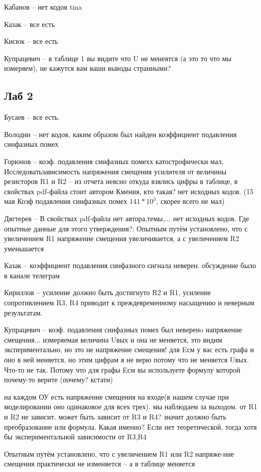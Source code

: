 \documentclass[a4paper,11pt]{article}
\begin{document}
Кабанов -- нет кодов tina

Казак -- все есть

Кисюк -- все есть

Купрацевич -- в таблице 1 вы видите что U не менеятся (а это то что мы измеряем), не кажутся вам ваши выводы странными? 


\subsection*{Лаб 2}

Бусаев -- все есть.

Володин -- нет кодов, каким образом был найден коэффициент подавления синфазных помех

Горюнов -- коэф. подавления синфазных помехх катострофически мал, Исследоватьзависимость напряжения смещения усилителя от величины резисторов R1 и R2
-- из отчета неясно откуда взялись цифры в таблице, в свойствах pdf-файла стоит автором Кмения, кто такая? нет исходных кодов. 
(15 мая Коэф подавления синфазных помех $141*10^3$, скорее всего не мал)

Дягтерев --  В свойствах pdf-файла нет автора,темы,... нет исходных кодов. Где опытные данные для этого утверждения?: Опытным путём установлено, что с увеличением R1 напряжение смещения увеличивается, а с увеличением R2 уменьшается

Казак -- коэффициент подавления синфазного сигнала неверен.
обсуждение было в канале телеграм

Кириллов -- усиление должно быть достигнуто R2 и R1, усиление сопротивлением R3, R4 приводит к преждевременному насыщению и неверным результатам.


Купрацевич -- коэф. подавления синфазных помех был неверенo
напряжение смещения...
измеряемая величина Uвых и она не меняется, это видим экспериментально,
но это не напряжение смещения! для Eсм у вас есть графа и оно в ней меняется, но этим цифрам я не верю потому что не меняется Uвых.
Что-то не так.
Потому что для графы Eсм вы используете формулу которой почему-то верите (почему? кстати)

на каждом ОУ есть напряжение смещения на входе(в нашем случае при моделировании оно одинаковое для всех трех). мы наблюдаем за выходом. от R1 и R2 не зависит. может быть зависит от R3 и R4? значит должно быть преобразование или формула.
Какая именно? Если нет теоретической, тогда хотя бы экспериментальной зависимости от R3,R4

Опытным путём установлено, что с увеличением R1 или R2 напряже-ние смещения практически не изменяется -- а в таблице меняется
\end{document}
